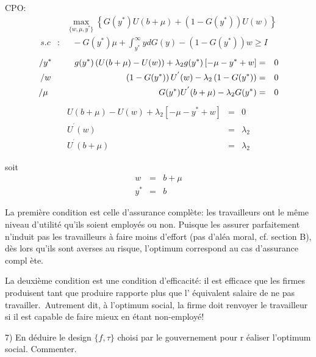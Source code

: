 \documentclass[a4paper]{article}
\begin{document}
CPO:%
\begin{eqnarray*}
&&\max_{\{w,\mu ,y^{\ast }\}}\left\{ G(y^{\ast })U(b+\mu )+\left(
1-G(y^{\ast })\right) U(w)\right\} \\
s.c &:&\text{ }-G(y^{\ast })\mu +\int_{y^{\ast }}^{\infty }ydG(y)-\left(
1-G(y^{\ast })\right) w\geq I
\end{eqnarray*}%
\begin{eqnarray*}
/y^{\ast }\text{ \ \ \ \ \ \ \ }g(y^{\ast })\left( U(b+\mu )-U(w)\right)
+\lambda _{2}g(y^{\ast })\left[ -\mu -y^{\ast }+w\right] &=&0 \\
/w\text{ \ \ \ \ \ \ \ \ \ \ \ \ \ \ \ \ \ \ \ \ \ \ \ \ \ }\left(
1-G(y^{\ast })\right) U^{^{\prime }}(w)-\lambda _{2}\left( 1-G(y^{\ast
})\right) &=&0 \\
/\mu \text{ \ \ \ \ \ \ \ \ \ \ \ \ \ \ \ \ \ \ \ \ \ \ \ \ \ \ \ \ \ \ \ \
\ \ \ \ \ \ }G(y^{\ast })U^{^{\prime }}(b+\mu )-\lambda _{2}G(y^{\ast }) &=&0
\end{eqnarray*}%
\begin{eqnarray*}
U(b+\mu )-U(w)+\lambda _{2}\left[ -\mu -y^{\ast }+w\right] &=&0 \\
U^{^{\prime }}(w) &=&\lambda _{2} \\
U^{^{\prime }}(b+\mu ) &=&\lambda _{2}
\end{eqnarray*}

soit%
\begin{eqnarray*}
w &=&b+\mu \\
y^{\ast } &=&b
\end{eqnarray*}

La premi\`{e}re condition est celle d'assurance compl\`{e}te: les
travailleurs ont le m\^{e}me niveau d'utilit\'{e} qu'ils soient employ\'{e}s
ou non. Puisque les assurer parfaitement n'induit pas les travailleurs \`{a}
faire moins d'effort (pas d'al\'{e}a moral, cf. section B), d\`{e}s lors
qu'ils sont averses au risque, l'optimum correspond au cas d'assurance compl%
\`{e}te.

La deuxi\`{e}me condition est une condition d'efficacit\'{e}: il est
efficace que les firmes produisent tant que produire rapporte plus que l'%
\'{e}quivalent salaire de ne pas travailler.\ Autrement dit, \`{a} l'optimum
social, la firme doit renvoyer le travailleur si il est capable de faire
mieux en \'{e}tant non-employ\'{e}!

\bigskip

7) En d\'{e}duire le design $\{f,\tau \}$ choisi par le gouvernement pour r%
\'{e}aliser l'optimum social. Commenter.
\end{document}
